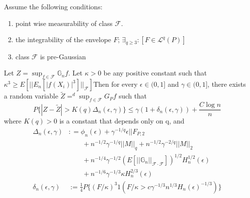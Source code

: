 \documentclass[uplatex,dvipdfmx]{jsarticle}
\begin{document}
\begin{theorem}
    Assume the following conditions:
    \begin{enumerate}[({A}1)]
        \item point wise measurability of class $\mathcal{F}$.
        \item the integrability of the envelope $F$; $\exists_{ q \geq 3}:[ F \in \mathcal{L}^q(P)]$
        \item class $\mathcal{F}$ is pre-Gaussian
    \end{enumerate}
    Let $ Z= \sup_{f \in \mathcal{F}} \mathbb{G}_n f $. Let $\kappa >0$ be any positive constant such that $\kappa^3 \geq E[ || E_n [ | f(X_i)|^3 ] ||_{\mathcal{F}}] $Then for every $\epsilon \in (0,1] $ and $\gamma \in (0,1] $, there exists a random variable $ \tilde{Z} =^d  \sup _{f \in \mathcal{F}} G_P f $ such that 
    \begin{equation}
        P\{ | Z - \tilde{Z}| > K(q) \Delta _n ( \epsilon, \gamma ) \}  \leq \gamma ( 1 + \delta_n (\epsilon , \gamma )) + \frac{ C \log n}{n}
    \end{equation}
    where $K(q)> 0 $ is a constant that depends only on q, and 
    \begin{align*}
        \Delta_n (\epsilon, \gamma )&: = \phi_n ( \epsilon) + \gamma ^{ -1/q} \epsilon || F _{P,2}\\
        &\qquad+ n^{-1/2} \gamma ^{-1/q} ||M||_q + n^{-1/2} \gamma^{-2/q} ||M||_2\\
        &\qquad+ n^{-1/4} \gamma^{-1/2} ( E[ || \mathbb{G}_n ||_{ \mathcal{F}\cdot \mathcal{F}}])^{1/2} H_n^{1/2} ( \epsilon)\\
        &\qquad+ n^{-1/6} \gamma^{-1/3} \kappa H_n ^{2/3} ( \epsilon)\\
        \delta_n ( \epsilon, \gamma )&:= \frac{1}{4} P \{ (F/\kappa)^3 1( F/ \kappa > c \gamma ^{-1/3}n^{1/3}H_n ( \epsilon)^{-1/3}) \}
    \end{align*}
\end{theorem}
\end{document}
